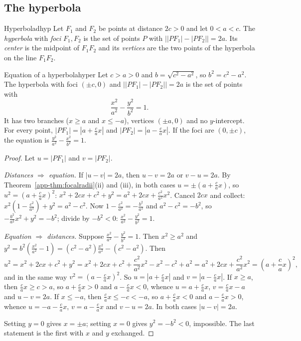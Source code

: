 \documentclass[11pt]{article}
\begin{document}
\subsection*{The hyperbola}

\begin{defn}{Hyperbola}{dhyp}
Let $F_1$ and $F_2$ be points at distance $2c>0$ and let $0<a<c$. The \emph{hyperbola} with \emph{foci} $F_1,F_2$ is the set of points $P$ with $\bigl\lvert\lvert PF_1\rvert-\lvert PF_2\rvert\bigr\rvert=2a$. Its \emph{center} is the midpoint of $F_1F_2$ and its \emph{vertices} are the two points of the hyperbola on the line $F_1F_2$.
\end{defn}

\begin{thm}{Equation of a hyperbola}{hyper}
Let $c>a>0$ and $b=\sqrt{c^2-a^2}$, so $b^2=c^2-a^2$. The hyperbola with foci $(\pm c,0)$ and $\bigl\lvert\lvert PF_1\rvert-\lvert PF_2\rvert\bigr\rvert=2a$ is the set of points with
\[
\frac{x^2}{a^2}-\frac{y^2}{b^2}=1 .
\]
It has two branches ($x\ge a$ and $x\le-a$), vertices $(\pm a,0)$ and no $y$-intercept. For every point, $\lvert PF_1\rvert=\left\lvert a+\frac cax\right\rvert$ and $\lvert PF_2\rvert=\left\lvert a-\frac cax\right\rvert$. If the foci are $(0,\pm c)$, the equation is $\frac{y^2}{a^2}-\frac{x^2}{b^2}=1$.
\end{thm}
\begin{proof}
Let $u=\lvert PF_1\rvert$ and $v=\lvert PF_2\rvert$.

\emph{Distances $\Rightarrow$ equation.} If $\lvert u-v\rvert=2a$, then $u-v=2a$ or $v-u=2a$. By Theorem~\ref{app-thm:focalradii}(ii) and (iii), in both cases $u=\pm\left(a+\frac cax\right)$, so $u^2=\left(a+\frac cax\right)^2$: $x^2+2cx+c^2+y^2=a^2+2cx+\frac{c^2}{a^2}x^2$. Cancel $2cx$ and collect: $x^2\left(1-\frac{c^2}{a^2}\right)+y^2=a^2-c^2$. Now $1-\frac{c^2}{a^2}=-\frac{b^2}{a^2}$ and $a^2-c^2=-b^2$, so $-\frac{b^2}{a^2}x^2+y^2=-b^2$; divide by $-b^2<0$: $\frac{x^2}{a^2}-\frac{y^2}{b^2}=1$.

\emph{Equation $\Rightarrow$ distances.} Suppose $\frac{x^2}{a^2}-\frac{y^2}{b^2}=1$. Then $x^2\ge a^2$ and $y^2=b^2\left(\frac{x^2}{a^2}-1\right)=(c^2-a^2)\frac{x^2}{a^2}-(c^2-a^2)$. Then
\[
u^2=x^2+2cx+c^2+y^2=x^2+2cx+c^2+\frac{c^2}{a^2}x^2-x^2-c^2+a^2=a^2+2cx+\frac{c^2}{a^2}x^2=\left(a+\frac cax\right)^2 ,
\]
and in the same way $v^2=\left(a-\frac cax\right)^2$. So $u=\left\lvert a+\frac cax\right\rvert$ and $v=\left\lvert a-\frac cax\right\rvert$. If $x\ge a$, then $\frac cax\ge c>a$, so $a+\frac cax>0$ and $a-\frac cax<0$, whence $u=a+\frac cax$, $v=\frac cax-a$ and $u-v=2a$. If $x\le-a$, then $\frac cax\le-c<-a$, so $a+\frac cax<0$ and $a-\frac cax>0$, whence $u=-a-\frac cax$, $v=a-\frac cax$ and $v-u=2a$. In both cases $\lvert u-v\rvert=2a$.

Setting $y=0$ gives $x=\pm a$; setting $x=0$ gives $y^2=-b^2<0$, impossible. The last statement is the first with $x$ and $y$ exchanged.
\end{proof}
\end{document}
